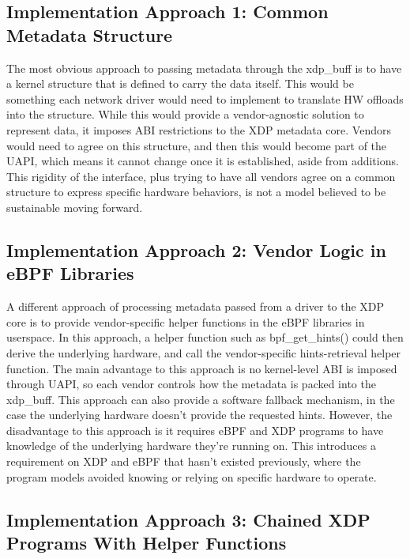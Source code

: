 \documentclass[letterpaper]{article}
\begin{document}
\subsection{Implementation Approach 1: Common Metadata Structure}

The most obvious approach to passing metadata through the xdp\_buff is to have a kernel structure that is defined to carry the data itself. This would be something each network driver would need to implement to translate HW offloads into the structure. While this would provide a vendor-agnostic solution to represent data, it imposes ABI restrictions to the XDP metadata core. Vendors would need to agree on this structure, and then this would become part of the UAPI, which means it cannot change once it is established, aside from additions. This rigidity of the interface, plus trying to have all vendors agree on a common structure to express specific hardware behaviors, is not a model believed to be sustainable moving forward.

\subsection{Implementation Approach 2: Vendor Logic in eBPF Libraries}

A different approach of processing metadata passed from a driver to the XDP core is to provide vendor-specific helper functions in the eBPF libraries in userspace. In this approach, a helper function such as bpf\_get\_hints() could then derive the underlying hardware, and call the vendor-specific hints-retrieval helper function. The main advantage to this approach is no kernel-level ABI is imposed through UAPI, so each vendor controls how the metadata is packed into the xdp\_buff. This approach can also provide a software fallback mechanism, in the case the underlying hardware doesn't provide the requested hints.
\newline
\indent However, the disadvantage to this approach is it requires eBPF and XDP programs to have knowledge of the underlying hardware they're running on. This introduces a requirement on XDP and eBPF that hasn't existed previously, where the program models avoided knowing or relying on specific hardware to operate.

\subsection{Implementation Approach 3: Chained XDP Programs With Helper Functions}
\end{document}
